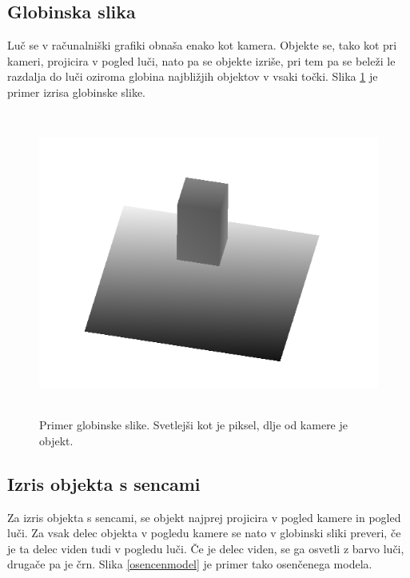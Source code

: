 \documentclass[a4paper, 12pt]{book}
\begin{document}
\subsection*{Globinska slika}
Luč se v računalniški grafiki obnaša enako kot kamera. Objekte se, tako kot pri kameri, projicira v pogled luči, nato pa se objekte izriše, pri tem pa se beleži le razdalja do luči oziroma globina najbližjih objektov v vsaki točki. Slika \ref{globinskaslika} je primer izrisa globinske slike.

\begin{figure}[h]
\begin{center}
\includegraphics[width=12cm, height=10cm, keepaspectratio=true]{Globinska_slika.png}
\end{center}
\caption{Primer globinske slike. Svetlejši kot je piksel, dlje od kamere je objekt.}
\label{globinskaslika}
\end{figure}

\subsection*{Izris objekta s sencami}
Za izris objekta s sencami, se objekt najprej projicira v pogled kamere in pogled luči. Za vsak delec objekta v pogledu kamere se nato v globinski sliki preveri, če je ta delec viden tudi v pogledu luči. Če je delec viden, se ga osvetli z barvo luči, drugače pa je črn. Slika \ref{osencenmodel} je primer tako osenčenega modela.
\end{document}
